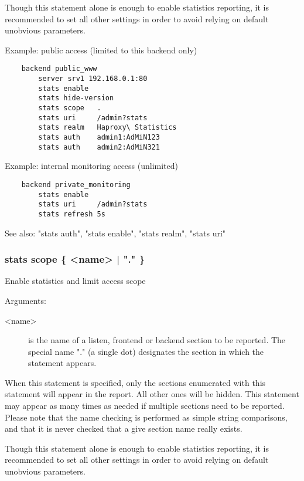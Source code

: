   Though this statement alone is enough to enable statistics reporting, it is
  recommended to set all other settings in order to avoid relying on default
  unobvious parameters.

  Example: public access (limited to this backend only)
  \begin{verbatim}
    backend public_www
        server srv1 192.168.0.1:80
        stats enable
        stats hide-version
        stats scope   .
        stats uri     /admin?stats
        stats realm   Haproxy\ Statistics
        stats auth    admin1:AdMiN123
        stats auth    admin2:AdMiN321
   \end{verbatim}

   Example: internal monitoring access (unlimited)
   \begin{verbatim}
    backend private_monitoring
        stats enable
        stats uri     /admin?stats
        stats refresh 5s
   \end{verbatim}

  See also: "stats auth", "stats enable", "stats realm", "stats uri"

\subsubsection[stats scope]{stats scope \{ <name> | "." \}}


  Enable statistics and limit access scope


  Arguments:
  \begin{description}
  \item[<name>] is the name of a listen, frontend or backend section to be
              reported. The special name "." (a single dot) designates the
              section in which the statement appears.
  \end{description}

  When this statement is specified, only the sections enumerated with this
  statement will appear in the report. All other ones will be hidden. This
  statement may appear as many times as needed if multiple sections need to be
  reported. Please note that the name checking is performed as simple string
  comparisons, and that it is never checked that a give section name really
  exists.

  Though this statement alone is enough to enable statistics reporting, it is
  recommended to set all other settings in order to avoid relying on default
  unobvious parameters.

